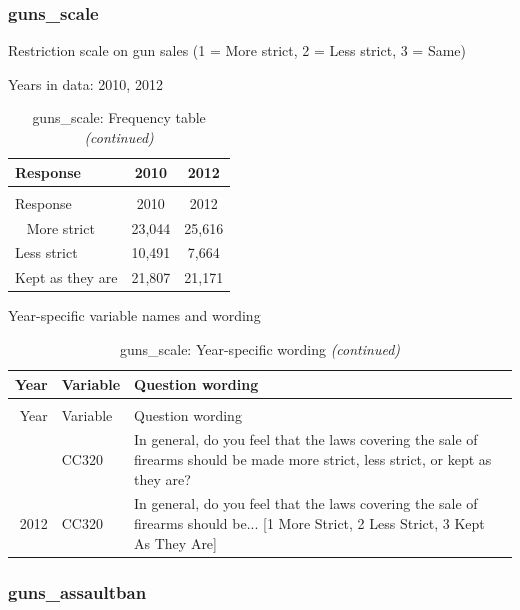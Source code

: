 \documentclass[12pt]{article}
\begin{document}
\subsubsection{guns\_scale}\label{guns_scale}

Restriction scale on gun sales (1 = More strict, 2 = Less strict, 3 =
Same)

Years in data: 2010, 2012\begingroup\fontsize{10}{12}\selectfont

\begin{longtable}[t]{lcc}
\caption{\label{tab:unnamed-chunk-4}guns\_scale: Frequency table}\\
\toprule
Response & 2010 & 2012\\
\midrule
\endfirsthead
\caption[]{guns\_scale: Frequency table \textit{(continued)}}\\
\toprule
Response & 2010 & 2012\\
\midrule
\endhead
\
\endfoot
\bottomrule
\endlastfoot
More strict & 23,044 & 25,616\\
Less strict & 10,491 & 7,664\\
Kept as they are & 21,807 & 21,171\\*
\end{longtable}

\endgroup{}

Year-specific variable names and wording

\begin{longtable}[t]{rl>{\raggedright\arraybackslash}p{10cm}}
\caption{\label{tab:unnamed-chunk-4}guns\_scale: Year-specific wording}\\
\toprule
Year & Variable & Question wording\\
\midrule
\endfirsthead
\caption[]{guns\_scale: Year-specific wording \textit{(continued)}}\\
\toprule
Year & Variable & Question wording\\
\midrule
\endhead
\
\endfoot
\bottomrule
\endlastfoot
2010 & CC320 & In general, do you feel that the laws covering the sale of firearms should be made more strict, less strict, or kept as they are?\\
2012 & CC320 & In general, do you feel that the laws covering the sale of firearms should be... [1 More Strict, 2 Less Strict, 3 Kept As They Are]\\*
\end{longtable}

\subsubsection{guns\_assaultban}\label{guns_assaultban}
\end{document}
